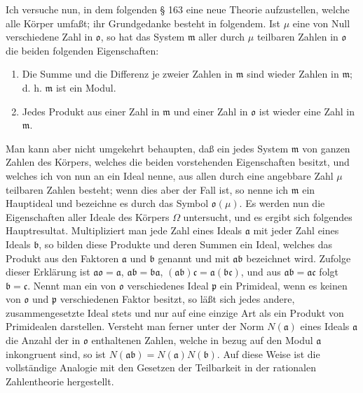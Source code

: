 \documentclass[11pt]{article}
\newcommand{\origpage}[1]{\par\vspace{0.25em}\noindent{\footnotesize\itshape [Gedruckte Seite #1]}\par\vspace{0.25em}}
\newcommand{\ideal}[1]{\mathfrak{#1}}
\begin{document}
\origpage{403}
Ich versuche nun, in dem folgenden § 163 eine neue Theorie aufzustellen, welche alle Körper umfaßt; ihr Grundgedanke besteht in folgendem. Ist $\mu$ eine von Null verschiedene Zahl in $\ideal{o}$, so hat das System $\ideal{m}$ aller durch $\mu$ teilbaren Zahlen in $\ideal{o}$ die beiden folgenden Eigenschaften:
\begin{enumerate}[label=\Roman*.]
\item Die Summe und die Differenz je zweier Zahlen in $\ideal{m}$ sind wieder Zahlen in $\ideal{m}$; d. h. $\ideal{m}$ ist ein Modul.
\item Jedes Produkt aus einer Zahl in $\ideal{m}$ und einer Zahl in $\ideal{o}$ ist wieder eine Zahl in $\ideal{m}$.
\end{enumerate}
Man kann aber nicht umgekehrt behaupten, daß ein jedes System $\ideal{m}$ von ganzen Zahlen des Körpers, welches die beiden vorstehenden Eigenschaften besitzt, und welches ich von nun an ein Ideal nenne, aus allen durch eine angebbare Zahl $\mu$ teilbaren Zahlen besteht; wenn dies aber der Fall ist, so nenne ich $\ideal{m}$ ein Hauptideal und bezeichne es durch das Symbol $\ideal{o}(\mu)$. Es werden nun die Eigenschaften aller Ideale des Körpers $\Omega$ untersucht, und es ergibt sich folgendes Hauptresultat. Multipliziert man jede Zahl eines Ideals $\ideal{a}$ mit jeder Zahl eines Ideals $\ideal{b}$, so bilden diese Produkte und deren Summen ein Ideal, welches das Produkt aus den Faktoren $\ideal{a}$ und $\ideal{b}$ genannt und mit $\ideal{a}\ideal{b}$ bezeichnet wird. Zufolge dieser Erklärung ist $\ideal{a}\ideal{o}=\ideal{a}$, $\ideal{a}\ideal{b}=\ideal{b}\ideal{a}$, $(\ideal{a}\ideal{b})\ideal{c}=\ideal{a}(\ideal{b}\ideal{c})$, und aus $\ideal{a}\ideal{b}=\ideal{a}\ideal{c}$ folgt $\ideal{b}=\ideal{c}$. Nennt man ein von $\ideal{o}$ verschiedenes Ideal $\ideal{p}$ ein Primideal, wenn es keinen von $\ideal{o}$ und $\ideal{p}$ verschiedenen Faktor besitzt, so läßt sich jedes andere, zusammengesetzte Ideal stets und nur auf eine einzige Art als ein Produkt von Primidealen darstellen. Versteht man ferner unter der Norm $N(\ideal{a})$ eines Ideals $\ideal{a}$ die Anzahl der in $\ideal{o}$ enthaltenen Zahlen, welche in bezug auf den Modul $\ideal{a}$ inkongruent sind, so ist $N(\ideal{a}\ideal{b})=N(\ideal{a})N(\ideal{b})$. Auf diese Weise ist die vollständige Analogie mit den Gesetzen der Teilbarkeit in der rationalen Zahlentheorie hergestellt.
\end{document}
